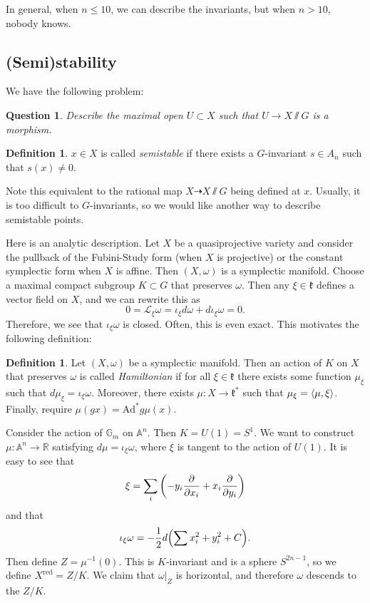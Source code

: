\documentclass[leqno, openany]{memoir}
\newtheorem{quest}[thm]{Question}
\theoremstyle{definition}
\newtheorem{defn}[thm]{Definition}
\theoremstyle{remark}
\theoremstyle{plain}
\theoremstyle{definition}
\theoremstyle{remark}
\newcommand{\A}{\mathbb{A}}
\newcommand{\R}{\mathbb{R}}
\newcommand{\mc}[1]{\mathcal{#1}}
\newcommand{\mf}[1]{\mathfrak{#1}}
\newcommand{\mr}[1]{\mathrm{#1}}
\begin{document}
In general, when $n \leq 10$, we can describe the invariants, but when $n > 10$, nobody knows.

\subsection{(Semi)stability}%
\label{sec:_semi_stability}

We have the following problem:
\begin{quest}
    Describe the maximal open $U \subset X$ such that $U \to X \sslash G$ is a morphism.
\end{quest}

\begin{defn}
    $x \in X$ is called \textit{semistable} if there exists a $G$-invariant $s \in A_n$ such that $s(x) \neq 0$.
\end{defn}

Note this equivalent to the rational map $X \dashrightarrow X \sslash G$ being defined at $x$. Usually, it is too difficult to $G$-invariants, so we would like another way to describe semistable points. 

Here is an analytic description. Let $X$ be a quasiprojective variety and consider the pullback of the Fubini-Study form (when $X$ is projective) or the constant symplectic form when $X$ is affine. Then $(X, \omega)$ is a symplectic manifold. Choose a maximal compact subgroup $K \subset G$ that preserves $\omega$. Then any $\xi \in \mf{k}$ defines a vector field on $X$, and we can rewrite this as
\[ 0 = \mc{L}_{\xi} \omega = \iota_{\xi} d \omega + d \iota_{\xi} \omega = 0. \]
Therefore, we see that $\iota_{\xi} \omega$ is closed. Often, this is even exact. This motivates the following definition:

\begin{defn}
    Let $(X, \omega)$ be a symplectic manifold. Then an action of $K$ on $X$ that preserves $\omega$ is called \textit{Hamiltonian} if for all $\xi \in \mf{k}$ there exists some function $\mu_{\xi}$ such that $d \mu_{\xi} = \iota_{\xi} \omega$. Moreover, there exists $\mu: X \to \mf{k}^*$ such that $\mu_{\xi} = \ev{ \mu, \xi }$. Finally, require $\mu(gx) = \mr{Ad}^* g \mu(x)$.
\end{defn}

Consider the action of $\mathbb{G}_m$ on $\A^n$. Then $K = U(1) = S^1$. We want to construct $\mu: \A^n \to \R$ satisfying $d \mu = \iota_{\xi} \omega$, where $\xi$ is tangent to the action of $U(1)$. It is easy to see that
\[ \xi = \sum_i \qty( -y_i \pdv{x_i} + x_i \pdv{y_i} ) \]
and that 
\[ \iota_{\xi} \omega = -\frac{1}{2} d \qty( \sum x_i^2 + y_i^2  + C). \] 
Then define $Z = \mu^{-1}(0)$. This is $K$-invariant and is a sphere $S^{2n-1}$, so we define $X^{\mr{red}} = Z/K$. We claim that $\omega |_Z$ is horizontal, and therefore $\omega$ descends to the $Z/K$.
\end{document}
